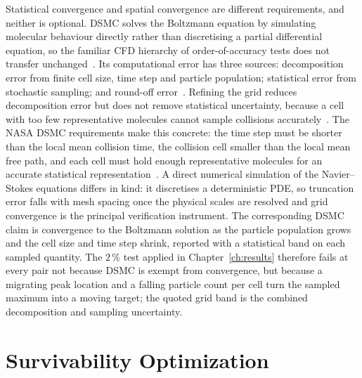 Statistical convergence and spatial convergence are different requirements, and neither is optional. DSMC solves the Boltzmann equation by simulating molecular behaviour directly rather than discretising a partial differential equation, so the familiar CFD hierarchy of order-of-accuracy tests does not transfer unchanged~\cite{chen2019dsmc}. Its computational error has three sources: decomposition error from finite cell size, time step and particle population; statistical error from stochastic sampling; and round-off error~\cite{chen2019dsmc}. Refining the grid reduces decomposition error but does not remove statistical uncertainty, because a cell with too few representative molecules cannot sample collisions accurately~\cite{ntrs2012dsmc}. The NASA DSMC requirements make this concrete: the time step must be shorter than the local mean collision time, the collision cell smaller than the local mean free path, and each cell must hold enough representative molecules for an accurate statistical representation~\cite{ntrs2012dsmc}. A direct numerical simulation of the Navier--Stokes equations differs in kind: it discretises a deterministic PDE, so truncation error falls with mesh spacing once the physical scales are resolved and grid convergence is the principal verification instrument. The corresponding DSMC claim is convergence to the Boltzmann solution as the particle population grows and the cell size and time step shrink, reported with a statistical band on each sampled quantity. The $2\,\%$ test applied in Chapter~\ref{ch:results} therefore fails at every pair not because DSMC is exempt from convergence, but because a migrating peak location and a falling particle count per cell turn the sampled maximum into a moving target; the quoted grid band is the combined decomposition and sampling uncertainty.


\section{Survivability Optimization}
\label{sec:ga_opt}

